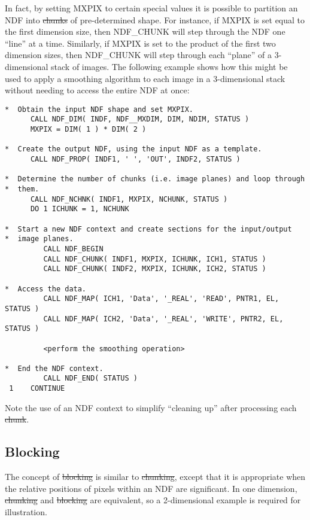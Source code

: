 In fact, by setting MXPIX to certain special values it is possible to partition
an NDF into \st{chunks\/} of pre-determined shape. For instance, if MXPIX is
set equal to the first dimension size, then NDF\_CHUNK will step through the NDF
one ``line'' at a time. Similarly, if MXPIX is set to the product of the first
two dimension sizes, then NDF\_CHUNK will step through each ``plane'' of a
3-dimensional stack of images. The following example shows how this might be
used to apply a smoothing algorithm to each image in a 3-dimensional stack
without needing to access the entire NDF at once:

\small
\begin{verbatim}
*  Obtain the input NDF shape and set MXPIX.
      CALL NDF_DIM( INDF, NDF__MXDIM, DIM, NDIM, STATUS )
      MXPIX = DIM( 1 ) * DIM( 2 )

*  Create the output NDF, using the input NDF as a template.
      CALL NDF_PROP( INDF1, ' ', 'OUT', INDF2, STATUS )

*  Determine the number of chunks (i.e. image planes) and loop through
*  them.
      CALL NDF_NCHNK( INDF1, MXPIX, NCHUNK, STATUS )
      DO 1 ICHUNK = 1, NCHUNK

*  Start a new NDF context and create sections for the input/output
*  image planes.
         CALL NDF_BEGIN
         CALL NDF_CHUNK( INDF1, MXPIX, ICHUNK, ICH1, STATUS )
         CALL NDF_CHUNK( INDF2, MXPIX, ICHUNK, ICH2, STATUS )

*  Access the data.
         CALL NDF_MAP( ICH1, 'Data', '_REAL', 'READ', PNTR1, EL, STATUS )
         CALL NDF_MAP( ICH2, 'Data', '_REAL', 'WRITE', PNTR2, EL, STATUS )

         <perform the smoothing operation>

*  End the NDF context.
         CALL NDF_END( STATUS )
 1    CONTINUE
\end{verbatim}
\normalsize

Note the use of an NDF context to simplify ``cleaning up'' after processing
each \st{chunk}.


\subsection{Blocking}

The concept of \st{blocking\/} is similar to \st{chunking}, except
that it is appropriate when the relative positions of pixels within an
NDF are significant. In one dimension, \st{chunking\/} and
\st{blocking\/} are equivalent, so a 2-dimensional example is required
for 
illustration.

